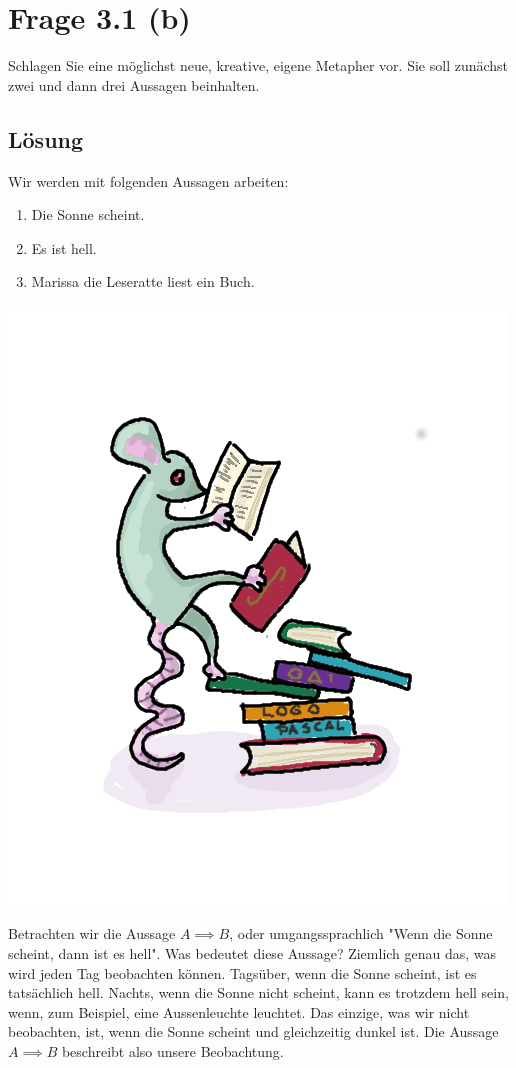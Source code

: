 \documentclass[
	12pt, %
	german, %
]{fphw}
\begin{document}
\section*{Frage 3.1 (b)}

\begin{problem}
	Schlagen Sie eine möglichst neue, kreative, eigene Metapher vor. Sie soll zunächst zwei und dann drei Aussagen beinhalten.
\end{problem}


\subsection*{Lösung}

Wir werden mit folgenden Aussagen arbeiten:
\begin{enumerate}[A:]
\item Die Sonne scheint.
\item Es ist hell.
\item Marissa die Leseratte liest ein Buch.
\end{enumerate}
\begin{center}
	\includegraphics[width=0.5\columnwidth]{Marissa.png}
\end{center}

Betrachten wir die Aussage \(A \implies B\), oder umgangssprachlich "Wenn die Sonne scheint, dann ist es hell". Was bedeutet diese Aussage? Ziemlich genau das, was wird jeden Tag beobachten können. Tagsüber, wenn die Sonne scheint, ist es tatsächlich hell. Nachts, wenn die Sonne nicht scheint, kann es trotzdem hell sein, wenn, zum Beispiel, eine Aussenleuchte leuchtet. Das einzige, was wir nicht beobachten, ist, wenn die Sonne scheint und gleichzeitig dunkel ist. Die Aussage \(A \implies B\) beschreibt also unsere Beobachtung.
\end{document}
